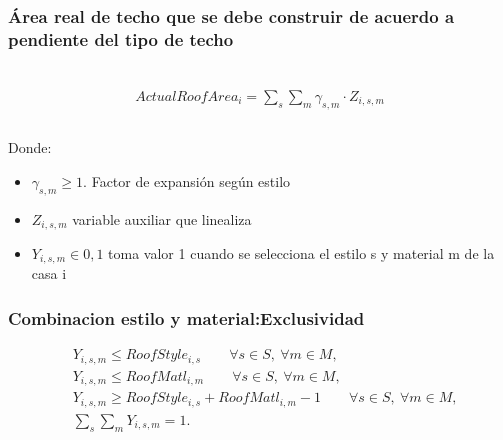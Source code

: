 \documentclass{article}
\begin{document}
\subsubsection{Área real de techo que se debe construir de acuerdo a pendiente del tipo de techo}\\
\begin{align}
    ActualRoofArea_{i}=\sum_{s}\sum_{m} \gamma_{s,m} \cdot Z_{i,s,m}\\
\end{align}
\\
Donde:
\begin{itemize}
    \item $\gamma_{s,m} \geq 1$. Factor de expansión según estilo
    \item  $Z_{i,s,m}$ variable auxiliar que linealiza 
    \item $Y_{i,s,m} \in 0,1$ toma valor 1 cuando se selecciona el estilo s y material m de la casa i
\end{itemize}


\subsubsection{Combinacion estilo y material:Exclusividad}
\begin{align}
& Y_{i,s,m} \le RoofStyle_{i,s} \qquad \forall s\in S,\ \forall m\in M, \\[2pt]
& Y_{i,s,m} \le RoofMatl_{i,m} \qquad \forall s\in S,\ \forall m\in M, \\[2pt]
& Y_{i,s,m} \ge RoofStyle_{i,s} + RoofMatl_{i,m} - 1 \qquad \forall s\in S,\ \forall m\in M, \\[4pt]
& \sum_{s}\sum_{m} Y_{i,s,m} = 1.
\end{align}
\end{document}
